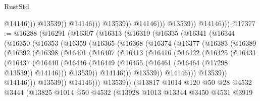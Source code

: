\begin{lexlean}{RustStd}
\begin{coremodule}
                                        @14146)))
                                  @13539))
                              @14146)))
                        @13539))
                    @14146)))
              @13539))
          @14146)))
@17377 := @16288
    (@16291
      (@16307
        (@16313
          (@16319
            (@16335
              (@16341
                (@16344
                  (@16350
                    (@16353
                      (@16359
                        (@16365
                          (@16368
                            (@16374
                              (@16377
                                (@16383
                                  (@16389
                                    (@16392
                                      (@16398
                                        (@16401
                                          (@16407
                                            (@16413
                                              (@16416
                                                (@16422
                                                  (@16425
                                                    (@16431
                                                      (@16437
                                                        (@16440
                                                          (@16446
                                                            (@16449
                                                              (@16455
                                                                (@16461
                                                                  (@16464 (@17298 @13539))
                                                                  @14146)))
                                                            @13539))
                                                        @14146)))
                                                  @13539))
                                              @14146)))
                                        @13539))
                                    @14146)))
                              @13539))
                          @14146)))
                    @13539))
                (@13817
                  @1014
                  @120
                  @50
                  @28
                  @4532
                  @3444
                  (@13825
                    @1014
                    @50
                    @4532
                    (@13928
                      @1013
                      @13344
                      @3450
                      @4531
                      @3919

\end{coremodule}
\end{lexlean}
